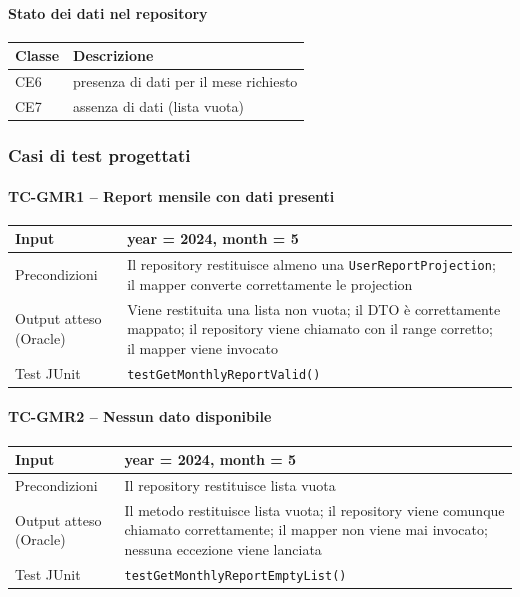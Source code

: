 \documentclass[a4paper,12pt]{article}
\begin{document}
\paragraph{Stato dei dati nel repository}
\begin{longtable}{|p{1.8cm}|p{11.5cm}|}
\hline
\textbf{Classe} & \textbf{Descrizione} \\ \hline
CE6 & presenza di dati per il mese richiesto \\ \hline
CE7 & assenza di dati (lista vuota) \\ \hline
\end{longtable}

\subsubsection{Casi di test progettati}

\paragraph{TC-GMR1 -- Report mensile con dati presenti}
\label{sec:TC-GMR1}
\begin{longtable}{|p{4cm}|p{10.3cm}|}
\hline
Input & year = 2024, month = 5 \\ \hline
Precondizioni & Il repository restituisce almeno una \texttt{UserReportProjection}; il mapper converte correttamente le projection \\ \hline
Output atteso (Oracle) & Viene restituita una lista non vuota; il DTO è correttamente mappato; il repository viene chiamato con il range corretto; il mapper viene invocato \\ \hline
Test JUnit & \texttt{testGetMonthlyReportValid()} \\ \hline
\end{longtable}

\paragraph{TC-GMR2 -- Nessun dato disponibile}
\label{sec:TC-GMR2}
\begin{longtable}{|p{4cm}|p{10.3cm}|}
\hline
Input & year = 2024, month = 5 \\ \hline
Precondizioni & Il repository restituisce lista vuota \\ \hline
Output atteso (Oracle) & Il metodo restituisce lista vuota; il repository viene comunque chiamato correttamente; il mapper non viene mai invocato; nessuna eccezione viene lanciata \\ \hline
Test JUnit & \texttt{testGetMonthlyReportEmptyList()} \\ \hline
\end{longtable}
\end{document}
